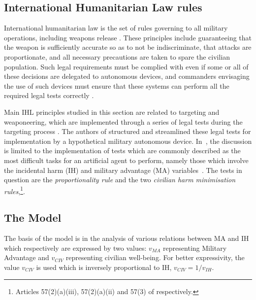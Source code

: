 \subsection{International Humanitarian Law rules}
\label{sec:ihl_model}
International humanitarian law is the set of rules governing to all military operations, including weapons release \cite{113Fleck}. 
These principles include guaranteeing that the weapon is sufficiently accurate so as to not be indiscriminate, that attacks are proportionate, and all necessary precautions are taken to spare the civilian population. Such legal requirements must be complied with even if some or all of these decisions are delegated to autonomous devices, and commanders envisaging the use of such devices must ensure that these systems can perform all the required legal tests correctly \cite{119BoothbyWEd}.

Main IHL principles studied in this section are related to targeting and weaponeering, which are implemented through a series of legal tests during the targeting process \cite{118DucheinePEtg,120HeineggWInkl,114CornGS}. The authors of \cite{zurek-coine22} structured and streamlined these legal tests for implementation by a hypothetical  military autonomous device. In~\cite{zurek2022jurix}, the discussion is limited to the implementation of tests which are commonly described as the most difficult tasks for an artificial agent to perform, namely those which involve the incidental harm (IH) and military advantage (MA) variables~\cite{119BoothbyWEd}. The tests in question are the \textit{proportionality rule} and the two \textit{civilian harm minimisation rules},\footnote{Articles 57(2)(a)(iii), 57(2)(a)(ii) and 57(3) of \cite{APIz} respectively.}.%
\subsection{The Model}

The basis of the model is in the analysis of various relations between MA and IH which respectively are expressed by two values: $v_{MA}$ representing Military Advantage and $v_{CIV}$ representing civilian well-being. For better expressivity, the value $v_{CIV}$ is used which is inversely proportional to IH, $v_{CIV} = 1/v_{IH}$.


